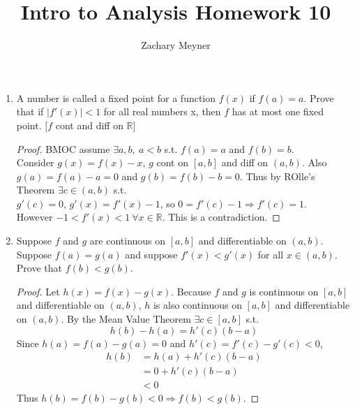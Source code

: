 \documentclass[12pt]{article}
\title{\large Intro to Analysis Homework 10}
\author{\large Zachary Meyner}
\date{}
\begin{document}
\maketitle
\begin{enumerate}
    \item A number is called a fixed point for a function $f(x)$ if $f(a) = a$. Prove that if $|f'(x)| < 1$ 
    for all real numbers x, then $f$ has at most one fixed point. [$f$ cont and diff on $\mathbb{R}$]
    \begin{proof}
        BMOC assume $\exists a,b, \ a < b$ s.t. $f(a) = a$ and $f(b) = b$. \\
        Consider $g(x) = f(x)-x$, $g$ cont on $[a, b]$ and diff on $(a,b)$. Also $g(a) = f(a)-a =0$
        and $g(b) = f(b) - b = 0$. Thus by ROlle's Theorem $\exists c \in (a,b)$ s.t. \\
        $g'(c) = 0$, $g'(x) = f'(x) - 1$, so $0 = f'(c)-1 \Rightarrow f'(c) = 1$. \\
        However $-1 < f'(x) < 1 \ \forall x \in \mathbb{R}$. This is a contradiction.
    \end{proof}

    \item Suppose $f$ and $g$ are continuous on $[a,b]$ and differentiable on $(a,b)$. \\
    Suppose $f(a)=g(a)$ and suppose $f'(x) < g'(x)$ for all $x \in (a,b)$. \\
    Prove that $f(b) < g(b)$.
    \begin{proof}
        Let $h(x) = f(x) - g(x)$. Because $f$ and $g$ is continuous on $[a,b]$ and differentiable 
        on $(a,b)$, $h$ is also continuous on $[a,b]$ and differentiable on $(a,b)$. By the Mean Value 
        Theorem $\exists c \in [a,b]$ s.t. 
        \[h(b) - h(a) = h'(c)(b-a)\]
        Since $h(a) = f(a) - g(a) = 0$ and $h'(c) = f'(c) - g'(c) < 0$,
        \begin{align*}
            h(b) &= h(a)+h'(c)(b-a) \\
            &= 0+h'(c)(b-a) \\
            &<0
        \end{align*}
        Thus $h(b) = f(b) - g(b) < 0 \Rightarrow f(b) < g(b)$.
    \end{proof}


\end{enumerate}
\end{document}

